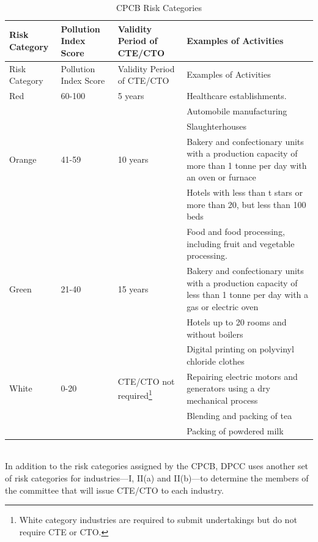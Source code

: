 \documentclass[a4paper, 12pt]{article}
\newcommand\tabitem{\makebox[1em][r]{\textbullet~}}
\begin{document}


\begin{longtable}{p{2cm}>{\raggedright}p{3.5cm}>{\raggedright}p{3.5cm}>{\raggedright\arraybackslash}p{6cm}}

\caption{CPCB Risk Categories} \\

Risk Category & Pollution Index Score & Validity Period of CTE/CTO & Examples of Activities \\
\midrule
\endfirsthead
Risk Category & Pollution Index Score & Validity Period of CTE/CTO & Examples of Activities \\
\midrule
\endhead
\endfoot
\endlastfoot

Red & 60-100 & 5 years & \tabitem Healthcare establishments. \\
 &  &  &   \tabitem Automobile manufacturing \\
  &  &  &  \tabitem Slaughterhouses \\
Orange & 41-59 & 10 years &  \tabitem Bakery and confectionary units with a production capacity of more than 1 tonne per day with an oven or furnace  \\
 &  &  & \tabitem Hotels with less than t stars or more than 20, but less than 100 beds \\
 &  &  & \tabitem Food and food processing, including fruit and vegetable processing.  \\
Green & 21-40 & 15 years & \tabitem Bakery and confectionary units with a production capacity of less than 1 tonne per day with a gas or electric oven \\
 &  &  &  \tabitem Hotels up to 20 rooms and without boilers \\
 &  &  & \tabitem Digital printing on polyvinyl chloride clothes \\
White & 0-20 & CTE/CTO not required\footnote{White category industries are required to submit undertakings but do not require CTE or CTO.} & \tabitem Repairing electric motors and generators using a dry mechanical process \\
 &  &  & \tabitem Blending and packing of tea \\
 &  &  & \tabitem Packing of powdered milk \\

\end{longtable}
\small{\textit{\parencite{CPCBrc}}} \\


                                  
                 In addition to the risk categories assigned by the CPCB, DPCC uses another set of risk categories for industries—I, II(a) and II(b)—to determine the members of the committee that will issue CTE/CTO to each industry.\\
                 
\end{document}
